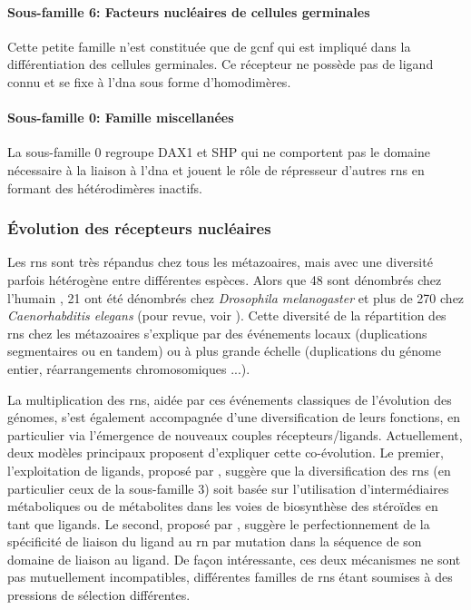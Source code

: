 \documentclass[../main.tex]{subfiles}
\begin{document}
\paragraph{Sous-famille 6: Facteurs nucléaires de cellules germinales}
Cette petite famille n'est constituée que de \gls{gcnf} qui est impliqué dans la différentiation des cellules germinales.
Ce récepteur ne possède pas de ligand connu et se fixe à l'\gls{dna} sous forme d'homodimères.

\paragraph{Sous-famille 0: Famille miscellanées}
La sous-famille 0 regroupe DAX1 et SHP qui ne comportent pas le domaine nécessaire à la liaison à l'\gls{dna} et jouent le rôle de répresseur d'autres \glspl{rn} en formant des hétérodimères inactifs.
\par

\subsubsection{Évolution des récepteurs nucléaires}
Les \glspl{rn} sont très répandus chez tous les métazoaires, mais avec une diversité parfois hétérogène entre différentes espèces.
Alors que 48 sont dénombrés chez l'humain \citep{Robinson-Rechavi2001}, 21 ont été dénombrés chez \textit{Drosophila melanogaster} et plus de 270 chez \textit{Caenorhabditis elegans} (pour revue, voir \citealp{Robinson-Rechavi2003}).
Cette diversité de la répartition des \glspl{rn} chez les métazoaires s'explique par des événements locaux (duplications segmentaires ou en tandem) ou à plus grande échelle (duplications du génome entier, réarrangements chromosomiques ...).
\par
La multiplication des \glspl{rn}, aidée par ces événements classiques de l'évolution des génomes, s'est également accompagnée d'une diversification de leurs fonctions, en particulier via l'émergence de nouveaux couples récepteurs/ligands.
Actuellement, deux modèles principaux proposent d'expliquer cette co-évolution.
Le premier, l'exploitation de ligands, proposé par \citet{Thornton2001}, suggère que la diversification des \glspl{rn} (en particulier ceux de la sous-famille 3) soit basée sur l'utilisation d'intermédiaires métaboliques ou de métabolites dans les voies de biosynthèse des stéroïdes en tant que ligands.
Le second, proposé par \citet{Escriva2006}, suggère le perfectionnement de la spécificité de liaison du ligand au \gls{rn} par mutation dans la séquence de son domaine de liaison au ligand.
De façon intéressante, ces deux mécanismes ne sont pas mutuellement incompatibles, différentes familles de \glspl{rn} étant soumises à des pressions de sélection différentes.
\end{document}
